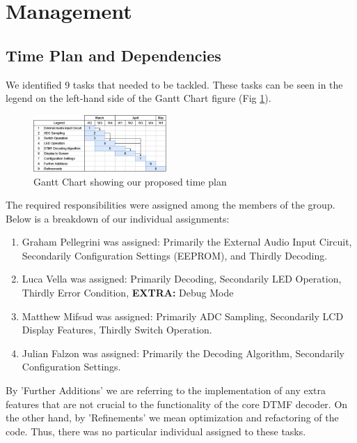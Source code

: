 \documentclass{cce2014-design}
\begin{document}
\section{Management}

\subsection{Time Plan and Dependencies}
\vspace{1em}
We identified 9 tasks that needed to be tackled.
These tasks can be seen in the legend on the left-hand side of the Gantt Chart\cite{GANTT_Wikipedia} figure (Fig \ref*{figure:ganttChart}).

\begin{figure}[!h]
   \centering
   \includegraphics[width=0.45\textwidth]{GanttChart.png}
   \caption{Gantt Chart showing our proposed time plan}
   \label{figure:ganttChart}
\end{figure}
\vspace{1em}
The required responsibilities were assigned among the members of the group. Below is a breakdown of our individual assignments:
\begin{enumerate}
   \item Graham Pellegrini was assigned: Primarily the External Audio Input Circuit, Secondarily Configuration Settings (EEPROM), and Thirdly Decoding.
   \item Luca Vella was assigned: Primarily Decoding, Secondarily LED Operation, Thirdly Error Condition, \textbf{EXTRA:} Debug Mode
   \item Matthew Mifsud was assigned: Primarily ADC Sampling, Secondarily LCD Display Features, Thirdly Switch Operation.
   \item Julian Falzon was assigned: Primarily the Decoding Algorithm, Secondarily Configuration Settings.
\end{enumerate}

By 'Further Additions' we are referring to the implementation of any extra features that are not crucial to the functionality of the core DTMF decoder.
On the other hand, by 'Refinements' we mean optimization and refactoring of the code.
Thus, there was no particular individual assigned to these tasks.
\end{document}
